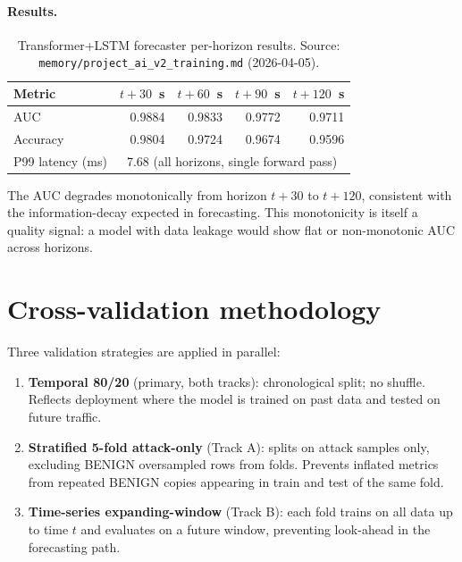 \paragraph{Results.}
\begin{table}[H]
\centering
\small
\caption{Transformer+LSTM forecaster per-horizon results.
Source: \texttt{memory/project\_ai\_v2\_training.md} (2026-04-05).}
\label{tab:forecast}
\begin{tabular}{@{}lrrrr@{}}
\toprule
Metric & $t{+}30$~s & $t{+}60$~s & $t{+}90$~s & $t{+}120$~s \\
\midrule
AUC      & 0.9884 & 0.9833 & 0.9772 & 0.9711 \\
Accuracy & 0.9804 & 0.9724 & 0.9674 & 0.9596 \\
\midrule
P99 latency (ms) & \multicolumn{4}{c}{7.68 (all horizons, single forward pass)} \\
\bottomrule
\end{tabular}
\end{table}

The AUC degrades monotonically from horizon $t{+}30$ to $t{+}120$,
consistent with the information-decay expected in forecasting.
This monotonicity is itself a quality signal: a model with data
leakage would show flat or non-monotonic AUC across horizons.

\section{Cross-validation methodology}
\label{sec:cv}

Three validation strategies are applied in parallel:

\begin{enumerate}
  \item \textbf{Temporal 80/20} (primary, both tracks): chronological
        split; no shuffle. Reflects deployment where the model is
        trained on past data and tested on future traffic.
  \item \textbf{Stratified 5-fold attack-only} (Track A): splits on
        attack samples only, excluding BENIGN oversampled rows from
        folds. Prevents inflated metrics from repeated BENIGN copies
        appearing in train and test of the same fold.
  \item \textbf{Time-series expanding-window} (Track B): each fold
        trains on all data up to time $t$ and evaluates on a future
        window, preventing look-ahead in the forecasting path.
\end{enumerate}

